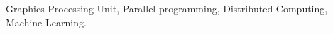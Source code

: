\documentclass[conference]{IEEEtran}
\begin{document}
\begin{abstract}


\end{abstract}

\begin{IEEEkeywords}
Graphics Processing Unit, Parallel programming, Distributed Computing, Machine Learning.
\end{IEEEkeywords}













\end{document}
